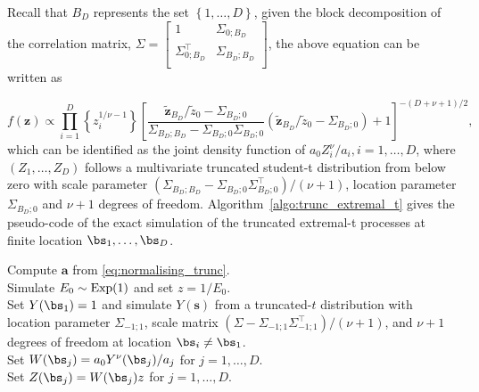 \documentclass[12pt]{article}
\begin{document}
Recall that $B_D$ represents the set $\left\{ 1, \ldots, D\right\}$, given the block decomposition of the correlation matrix, $\Sigma = \begin{bmatrix}
	1 & \Sigma_{0;B_D} \\
	\Sigma_{0;B_D}^\top & \Sigma_{B_D;B_D} \\
\end{bmatrix}$, 
the above equation can be written as

\begin{equation*}
    f(\bm z) \propto \prod_{i=1}^D \left\{z_i^{1/\nu-1}\right\} 
    \left[ \frac{\tilde{\bm z}_{B_D}/\tilde{z}_0 - \Sigma_{B_D;0}}{\Sigma_{B_D;B_D} - \Sigma_{B_D;0}\Sigma_{B_D;0}}
    \left(\tilde{\bm z}_{B_D}/\tilde{z}_0 - \Sigma_{B_D;0}\right) + 1 \right]^{-(D+\nu+1)/2},    
\end{equation*}
which can be identified as the joint density function of $a_0 Z_i^\nu/a_i,i=1,\dots,D$, where $(Z_1,\dots,Z_D)$ follows a multivariate truncated student-t distribution from below zero with scale parameter $(\Sigma_{B_D;B_D} - \Sigma_{B_D;0} \Sigma_{B_D;0}^\top) / (\nu+1)$, location parameter $\Sigma_{B_D;0}$ and $\nu+1$ degrees of freedom. Algorithm~\ref{algo:trunc_extremal_t} gives the pseudo-code of the exact simulation of the truncated extremal-t processes at finite location $\bs_1,\dots,\bs_D$.

\begin{algorithm}
\caption{Exact simulation of truncated extremal-t processes at locations $\bm s = (\bs_1,\dots,\bs_D)$.}
\label{algo:trunc_extremal_t}
Compute $\bm a$ from  \eqref{eq:normalising_trunc}. \\
Simulate $E_0 \sim \rm{Exp}(1)$ and set $z=1/E_0$. \\ 
Set $Y(\bs_1)=1$ and simulate $Y(\bm s)$ from a truncated-$t$ distribution with location parameter $\Sigma_{-1;1}$, scale matrix $(\Sigma - \Sigma_{-1;1}\Sigma_{-1;1}^\top)/(\nu+1)$, and $\nu+1$ degrees of freedom at location $\bs_i\neq \bs_1$.\\ 
Set $W(\bs_j) = a_0 Y^{\nu}(\bs_j)/a_j$ for $j=1,\dots,D$. \\
Set $Z(\bs_j) = W(\bs_j)z$ for $j=1,\dots,D$. \\
\end{algorithm}
\end{document}
